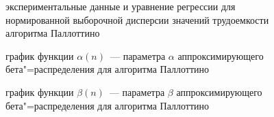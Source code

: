 \documentclass[a4paper,fontsize=14pt]{article}
\begin{document}
\begin{figure}[!]
	\caption{экспериментальные данные и уравнение регрессии для нормированной выборочной дисперсии значений трудоемкости алгоритма Паллоттино}
	\label{image2}
\end{figure}

\begin{figure}[!]
	\caption{график функции $\alpha(n)$~--- параметра $\alpha$ аппроксимирующего бета"=распределения для алгоритма Паллоттино}
	\label{image3}
\end{figure}

\begin{figure}[!]
	\caption{график функции $\beta(n)$~--- параметра $\beta$ аппроксимирующего бета"=распределения для алгоритма Паллоттино}
	\label{image4}
\end{figure}
\end{document}
